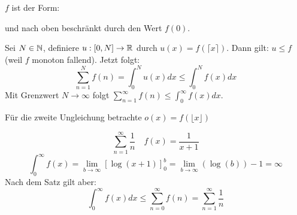\documentclass[main.tex]{subfiles}
\begin{document}
\begin{Beweis}
  $f$ ist der Form:
  \begin{center}
  \end{center}

  und nach oben beschränkt durch den Wert $f(0)$.

  Sei $N \in \mathbb{N}$, definiere $u:[0,N] \to \mathbb{R}$ durch $u(x) = f(\lceil x\rceil)$. Dann gilt: $u \leq f$ (weil $f$ monoton fallend). Jetzt folgt:
  $$\sum \limits_{n = 1}^N f(n) = \int_0^N u(x)dx \leq \int_0^N f(x)dx$$
  Mit Grenzwert $N \to \infty$ folgt $\sum \limits_{n=1}^\infty f(n) \leq \int_0^\infty f(x)dx$.

  Für die zweite Ungleichung betrachte $o(x) = f(\lfloor x \rfloor)$
\end{Beweis}

\begin{Beispiel}
  $$\sum \limits_{n=1}^\infty \dfrac{1}{n} \quad f(x) = \dfrac{1}{x+1}$$
  $$\int_0^\infty f(x) = \lim \limits_{b \to \infty} [\log(x+1)]_0^b = \lim \limits_{b \to \infty} (\log(b)) - 1 = \infty$$
  Nach dem Satz gilt aber:
  $$\int_0^\infty f(x)dx \leq \sum \limits_{n=0}^\infty f(n) = \sum \limits_{n=1}^\infty \dfrac{1}{n}$$
\end{Beispiel}
\end{document}
